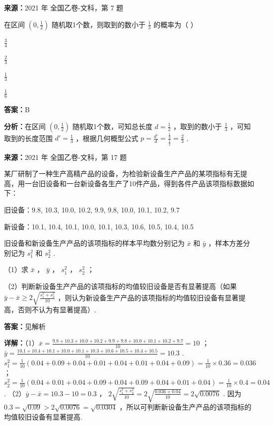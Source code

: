 \begin{question}[points=5]
\textbf{来源：}2021 年 全国乙卷-文科，第 7 题\par
在区间 $(0,\frac{1}{2})$ 随机取1个数，则取到的数小于 $\frac{1}{3}$ 的概率为（ ）
\begin{choices}
  \item $\frac{3}{4}$
  \item $\frac{2}{3}$
  \item $\frac{1}{3}$
  \item $\frac{1}{6}$
\end{choices}
\begin{solution}
\textbf{答案：}B

\textbf{分析：}在区间 $(0,\frac{1}{2})$ 随机取1个数，可知总长度 $d = \frac{1}{2}$ ，取到的数小于 $\frac{1}{3}$ ，可知取到的长度范围 $d' = \frac{1}{3}$ ，根据几何概型公式 $p = \frac{d'}{d} = \frac{\frac{1}{3}}{\frac{1}{2}} = \frac{2}{3}$ .
\end{solution}
\end{question}

\begin{question}[points=12]
\textbf{来源：}2021 年 全国乙卷-文科，第 17 题\par
某厂研制了一种生产高精产品的设备，为检验新设备生产产品的某项指标有无提高，用一台旧设备和一台新设备各生产了10件产品，得到各件产品该项指标数据如下：



旧设备：9.8, 10.3, 10.0, 10.2, 9.9, 9.8, 10.0, 10.1, 10.2, 9.7



新设备：10.1, 10.4, 10.1, 10.0, 10.1, 10.3, 10.6, 10.5, 10.4, 10.5



旧设备和新设备生产产品的该项指标的样本平均数分别记为 $\bar{x}$ 和 $\bar{y}$ ，样本方差分别记为 $s_1^2$ 和 $s_2^2$ .



（1）求 $\bar{x}$ ， $\bar{y}$ ， $s_1^2$ ， $s_2^2$ ；



（2）判断新设备生产产品的该项指标的均值较旧设备是否有显著提高（如果 $\bar{y} - \bar{x} \ge 2\sqrt{\frac{s_1^2 + s_2^2}{10}}$ ，则认为新设备生产产品的该项指标的均值较旧设备有显著提高，否则不认为有显著提高）. 
\begin{solution}
\textbf{答案：}见解析

\textbf{详解：}（1）$\bar{x} = \frac{9.8+10.3+10.0+10.2+9.9+9.8+10.0+10.1+10.2+9.7}{10} = 10$ ；
$\bar{y} = \frac{10.1+10.4+10.1+10.0+10.1+10.3+10.6+10.5+10.4+10.5}{10} = 10.3$ .
$s_1^2 = \frac{1}{10}(0.04+0.09+0.04+0.01+0.04+0.01+0.04+0.09) = \frac{1}{10}\times0.36 = 0.036$ ；
$s_2^2 = \frac{1}{10}(0.04+0.01+0.04+0.09+0.04+0.09+0.04+0.01+0.04) = \frac{1}{10}\times0.4 = 0.04$ .
（2）$\bar{y} - \bar{x} = 10.3 - 10 = 0.3$ ，
$2\sqrt{\frac{s_1^2 + s_2^2}{10}} = 2\sqrt{\frac{0.036+0.04}{10}} = 2\sqrt{0.0076}$ .
因为 $0.3 = \sqrt{0.09} > 2\sqrt{0.0076} = \sqrt{0.0304}$ ，所以可判断新设备生产产品的该项指标的均值较旧设备有显著提高.
\end{solution}
\end{question}

